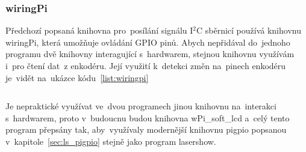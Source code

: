 \subsubsection{wiringPi}
Předchozí popsaná knihovna pro~posílání signálu I$^{2}$C sběrnicí používá knihovnu wiringPi, která umožňuje ovládání GPIO pinů. Abych nepřidával do~jednoho programu dvě knihovny interagující s~hardwarem, stejnou knihovnu využívám i~pro čtení dat~z enkodéru. Její využití k~detekci změn na~pinech enkodéru je~vidět na~ukázce kódu~\ref{list:wiringpi}

\begin{code}
    \inputminted[frame=lines,fontsize=\footnotesize{}, linenos, breaklines]{cpp}{code_examples/wiringpi_isr.cpp}
\end{code}

Je nepraktické využívat ve~dvou programech jinou knihovnu na~interakci s~hardwarem, proto v~budoucnu budou knihovna wPi\_soft\_lcd a~celý tento program přepsány tak, aby~využívaly modernější knihovnu pigpio popsanou v~kapitole~\ref{sec:ls_pigpio} stejně jako program lasershow.


